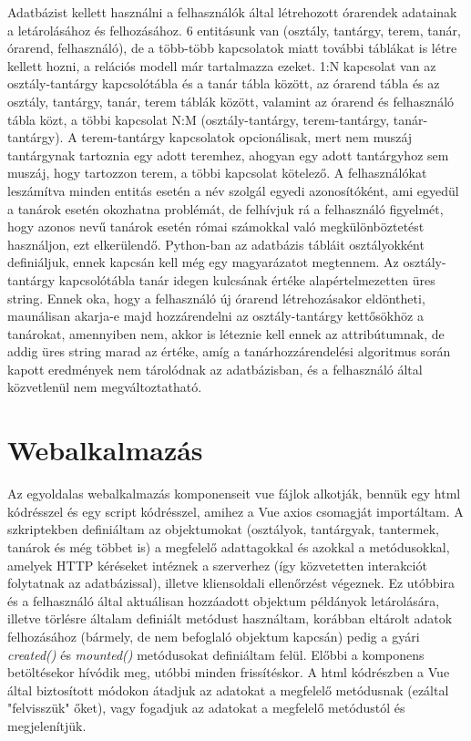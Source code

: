 Adatbázist kellett használni a felhasználók által létrehozott órarendek adatainak a letárolásához és felhozásához. 6 entitásunk van (osztály, tantárgy, terem, tanár, órarend, felhasználó), de a több-több kapcsolatok miatt további táblákat is létre kellett hozni, a relációs modell már tartalmazza ezeket. 1:N kapcsolat van az osztály-tantárgy kapcsolótábla és a tanár tábla között, az órarend tábla és az osztály, tantárgy, tanár, terem táblák között, valamint az órarend és felhasználó tábla közt, a többi kapcsolat N:M (osztály-tantárgy, terem-tantárgy, tanár-tantárgy). A terem-tantárgy kapcsolatok opcionálisak, mert nem muszáj tantárgynak tartoznia egy adott teremhez, ahogyan egy adott tantárgyhoz sem muszáj, hogy tartozzon terem, a többi kapcsolat kötelező. A felhasználókat leszámítva minden entitás esetén a név szolgál egyedi azonosítóként, ami egyedül a tanárok esetén okozhatna problémát, de felhívjuk rá a felhasználó figyelmét, hogy azonos nevű tanárok esetén római számokkal való megkülönböztetést használjon, ezt elkerülendő. Python-ban az adatbázis tábláit osztályokként definiáljuk, ennek kapcsán kell még egy magyarázatot megtennem. Az osztály-tantárgy kapcsolótábla tanár idegen kulcsának értéke alapértelmezetten üres string. Ennek oka, hogy a felhasználó új órarend létrehozásakor eldöntheti, maunálisan akarja-e majd hozzárendelni az osztály-tantárgy kettősökhöz a tanárokat, amennyiben nem, akkor is léteznie kell ennek az attribútumnak, de addig üres string marad az értéke, amíg a tanárhozzárendelési algoritmus során kapott eredmények nem tárolódnak az adatbázisban, és a felhasználó által közvetlenül nem megváltoztatható.

\section{Webalkalmazás}

Az egyoldalas webalkalmazás komponenseit vue fájlok alkotják, bennük egy html kódrésszel és egy script kódrésszel, amihez a Vue axios csomagját importáltam. A szkriptekben definiáltam az objektumokat (osztályok, tantárgyak, tantermek, tanárok és még többet is) a megfelelő adattagokkal és azokkal a metódusokkal, amelyek HTTP kéréseket intéznek a szerverhez (így közvetetten interakciót folytatnak az adatbázissal), illetve kliensoldali ellenőrzést végeznek. Ez utóbbira és a felhasználó által aktuálisan hozzáadott objektum példányok letárolására, illetve törlésre általam definiált metódust használtam, korábban eltárolt adatok felhozásához (bármely, de nem befoglaló objektum kapcsán) pedig a gyári \textit{created()} és \textit{mounted()} metódusokat definiáltam felül. Előbbi a komponens betöltésekor hívódik meg, utóbbi minden frissítéskor. A html kódrészben a Vue által biztosított módokon átadjuk az adatokat a megfelelő metódusnak (ezáltal "felvisszük" őket), vagy fogadjuk az adatokat a megfelelő metódustól és megjelenítjük.

